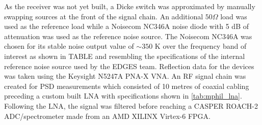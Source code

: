 As the receiver was not yet built, a Dicke switch was approximated by manually swapping sources at the front of the signal chain. An additional $50 \Omega$ load was used as the reference load while a Noisecom NC346A noise diode with 5 dB of attenuation was used as the reference noise source. The Noisecom NC346A was chosen for its stable noise output value of $\sim 350$ K over the frequency band of interest as shown in TABLE and resembling the specifications of the internal reference noise source used by the EDGES team. Reflection data for the devices was taken using the Keysight N5247A PNA-X VNA. An RF signal chain was created for PSD measurements which consisted of 10 metres of coaxial cabling preceding a custom built LNA with specifications shown in \cref{tab:mphil_lna}. Following the LNA, the signal was filtered before reaching a CASPER ROACH-2 ADC/spectrometer made from an AMD XILINX Virtex-6 FPGA.

